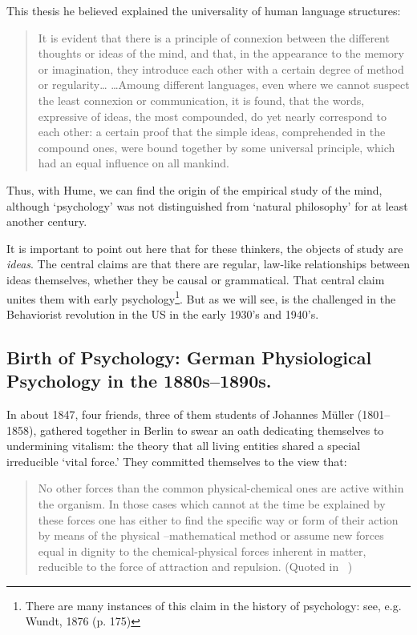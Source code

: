 \begin{refsection}
This thesis he believed explained the universality of human language structures:

\begin{quote}

It is evident that there is a principle of connexion between the different thoughts or ideas of the mind, and that, in the appearance to the memory or imagination, they introduce each other with a certain degree of method or regularity{\ldots} {\ldots}Amoung different languages, even where we cannot suspect the least connexion or communication, it is found, that the words, expressive of ideas, the most compounded, do yet nearly correspond to each other: a certain proof that the simple ideas, comprehended in the compound ones, were bound together by some universal principle, which had an equal influence on all mankind.
\end{quote}

Thus, with Hume, we can find the origin of the empirical study of the mind, although `psychology' was not distinguished from `natural philosophy' for at least another century.

It is important to point out here that for these thinkers, the objects of study are \emph{ideas}. The central claims are that there are regular, law-like relationships between ideas themselves, whether they be causal or grammatical. That central claim unites them with early psychology\footnote{There are many instances of this claim in the history of psychology: see, e.g. Wundt, 1876 (p. 175)}. But as we will see, is the challenged in the Behaviorist revolution in the US in the early 1930’s and 1940’s.

\subsection{Birth of Psychology: German Physiological Psychology in the 1880s--1890s.}
\label{birthofpsychology:germanphysiologicalpsychologyinthe1880s-1890s.}

In about 1847, four friends, three of them students of Johannes Müller (1801--1858), gathered together in Berlin to swear an oath dedicating themselves to undermining vitalism: the theory that all living entities shared a special irreducible ‘vital force.’ They committed themselves to the view that:

\begin{quote}

No other forces than the common physical-chemical ones are active within the organism. In those cases which cannot at the time be explained by these forces one has either to find the specific way or form of their action by means of the physical –mathematical method or assume new forces equal in dignity to the chemical-physical forces inherent in matter, reducible to the force of attraction and repulsion. (Quoted in ~\citep{Bernfeld:1949ji})
\end{quote}


\end{refsection}
